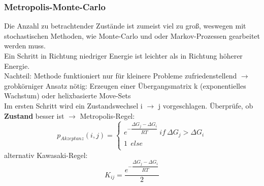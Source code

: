 \subsubsection{Metropolis-Monte-Carlo}
Die Anzahl zu betrachtender Zustände ist zumeist viel zu groß, weswegen mit stochastischen Methoden, wie Monte-Carlo und oder Markov-Prozessen gearbeitet werden muss. \\
Ein Schritt in Richtung niedriger Energie ist leichter als in Richtung höherer Energie. \\ 
Nachteil: Methode funktioniert nur für kleinere Probleme zufriedenstellend $\rightarrow$ grobkörniger Ansatz nötig: Erzeugen einer Übergangsmatrix k (exponentielles Wachstum) oder helixbasierte Move-Sets \\
Im ersten Schritt wird ein Zustandswechsel i $\rightarrow$ j vorgeschlagen. Überprüfe, ob \textbf{Zustand} besser ist $\rightarrow$ Metropolis-Regel: \\
\begin{equation}
p_{Akzeptanz}(i,j) =
\begin{cases}
e^{-\dfrac{\Delta G_j - \Delta G_i}{RT}} \ if \ \Delta G_j > \Delta G_i \\ 1 \ \ else \\
\end{cases}
\end{equation}
alternativ Kawasaki-Regel: \\
\begin{equation}
K_{ij} = \dfrac{e^{-\dfrac{\Delta G_j - \Delta G_i}{RT}}}{2}
\end{equation}

